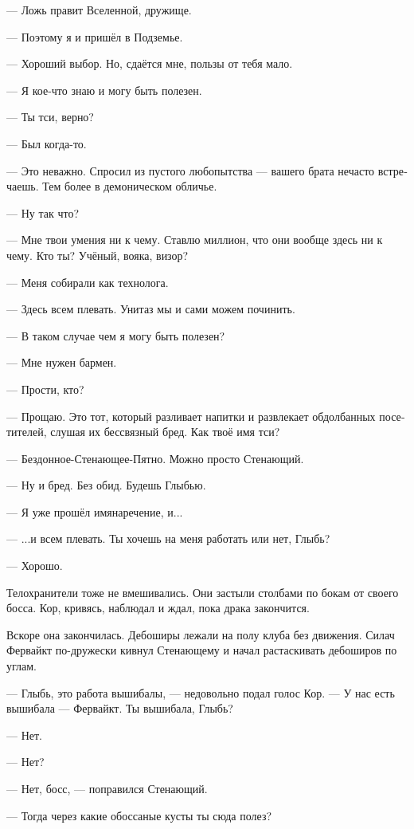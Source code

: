 \documentclass[a4paper,12pt,fleqn]{book}\usepackage{cooltooltips}\usepackage{polyglossia}\setdefaultlanguage[babelshorthands=true]{russian}\setotherlanguage{english}\defaultfontfeatures{Ligatures=TeX,Mapping=tex-text} \usepackage{xcolor}\definecolor{lightgray}{HTML}{bbbbbb}\color{lightgray}\newcommand{\ml}[3]{\textenglish{\textcolor{black}{#3}}}
\newcommand{\asterism}{\vspace{1em}{\centering\Large\bfseries$\ast~\ast~\ast$\par}\vspace{1em}}
\begin{document}
--- Ложь правит Вселенной, дружище.

--- Поэтому я и пришёл в Подземье.

--- Хороший выбор.
Но, сдаётся мне, пользы от тебя мало.

--- Я кое-что знаю и могу быть полезен.

--- Ты тси, верно?

--- Был когда-то.

--- Это неважно.
Спросил из пустого любопытства --- вашего брата нечасто встречаешь.
Тем более в демоническом обличье.

--- Ну так что?

--- Мне твои умения ни к чему.
Ставлю миллион, что они вообще здесь ни к чему.
Кто ты?
Учёный, вояка, визор?

--- Меня собирали как технолога.

--- Здесь всем плевать.
Унитаз мы и сами можем починить.

--- В таком случае чем я могу быть полезен?

--- Мне нужен бармен.

--- Прости, кто?

--- Прощаю.
Это тот, который разливает напитки и развлекает обдолбанных посетителей, слушая их бессвязный бред.
Как твоё имя тси?

--- Бездонное-Стенающее-Пятно.
Можно просто Стенающий. %

--- Ну и бред.
Без обид.
Будешь Глыбью. %

--- Я уже прошёл имянаречение, и...

--- ...и всем плевать.
Ты хочешь на меня работать или нет, Глыбь?

--- Хорошо.

\asterism

Телохранители тоже не вмешивались.
Они застыли столбами по бокам от своего босса.
Кор, кривясь, наблюдал и ждал, пока драка закончится.

Вскоре она закончилась.
Дебоширы лежали на полу клуба без движения.
Силач Фервайкт по-дружески кивнул Стенающему и начал растаскивать дебоширов по углам.

--- Глыбь, это работа вышибалы, --- недовольно подал голос Кор.
--- У нас есть вышибала --- Фервайкт.
Ты вышибала, Глыбь?

--- Нет.

--- Нет?

--- Нет, босс, --- поправился Стенающий.

--- Тогда через какие обоссаные кусты ты сюда полез?
\end{document}

